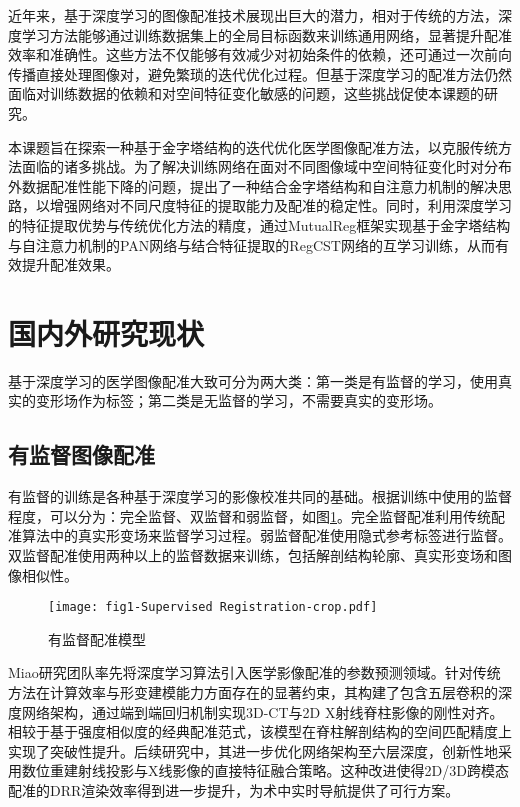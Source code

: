 近年来，基于深度学习的图像配准技术展现出巨大的潜力，相对于传统的方法，深度学习方法能够通过训练数据集上的全局目标函数来训练通用网络，显著提升配准效率和准确性。这些方法不仅能够有效减少对初始条件的依赖，还可通过一次前向传播直接处理图像对，避免繁琐的迭代优化过程。但基于深度学习的配准方法仍然面临对训练数据的依赖和对空间特征变化敏感的问题，这些挑战促使本课题的研究。

本课题旨在探索一种基于金字塔结构的迭代优化医学图像配准方法，以克服传统方法面临的诸多挑战。为了解决训练网络在面对不同图像域中空间特征变化时对分布外数据配准性能下降的问题，提出了一种结合金字塔结构和自注意力机制的解决思路，以增强网络对不同尺度特征的提取能力及配准的稳定性。同时，利用深度学习的特征提取优势与传统优化方法的精度，通过MutualReg框架\cite{liu2024mutualreg}实现基于金字塔结构与自注意力机制的PAN网络\cite{wang2024pyramid}与结合特征提取的RegCST网络\cite{bigalke2023unsupervised}的互学习训练，从而有效提升配准效果。


\section{国内外研究现状}

基于深度学习的医学图像配准大致可分为两大类：第一类是有监督的学习，使用真实的变形场作为标签；第二类是无监督的学习，不需要真实的变形场。

\subsection{有监督图像配准}

有监督的训练是各种基于深度学习的影像校准共同的基础。根据训练中使用的监督程度，可以分为：完全监督、双监督和弱监督，如图\ref{fig:1}。完全监督配准利用传统配准算法中的真实形变场来监督学习过程。弱监督配准使用隐式参考标签进行监督。双监督配准使用两种以上的监督数据来训练，包括解剖结构轮廓、真实形变场和图像相似性。

\begin{figure}[h]
    \centering
    \texttt{[image: fig1-Supervised Registration-crop.pdf]}
    \caption{有监督配准模型}
    \label{fig:1}
\end{figure}

Miao研究团队率先将深度学习算法引入医学影像配准的参数预测领域。针对传统方法在计算效率与形变建模能力方面存在的显著约束，其构建了包含五层卷积的深度网络架构，通过端到端回归机制实现3D-CT与2D X射线脊柱影像的刚性对齐。相较于基于强度相似度的经典配准范式，该模型在脊柱解剖结构的空间匹配精度上实现了突破性提升\cite{miao2016cnn}。后续研究中，其进一步优化网络架构至六层深度，创新性地采用数位重建射线投影与X线影像的直接特征融合策略。这种改进使得2D/3D跨模态配准的DRR渲染效率得到进一步提升，为术中实时导航提供了可行方案\cite{miao2016real}。

